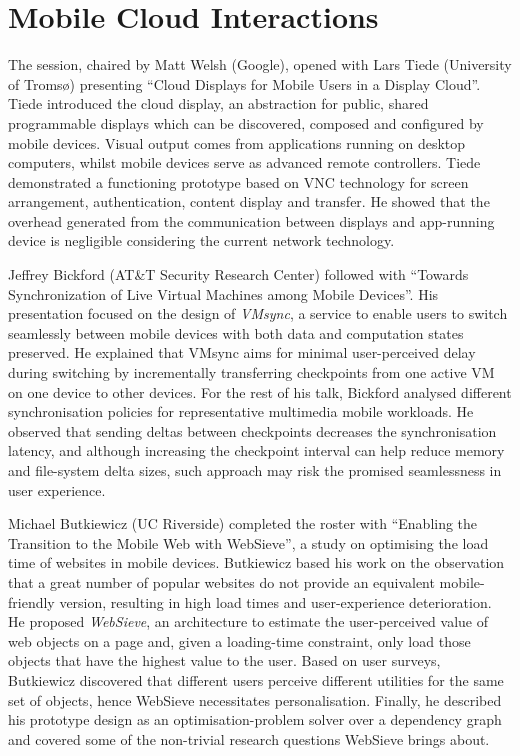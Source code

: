 \section{Mobile Cloud Interactions}
\label{sec:mobilecloud}

The session, chaired by Matt Welsh (Google), opened with Lars Tiede
(University of Tromsø) presenting ``Cloud Displays for Mobile Users in a
Display Cloud''. Tiede introduced the cloud display, an abstraction for
public, shared programmable displays which can be discovered, composed
and configured by mobile devices. Visual output comes from
applications running on desktop computers, whilst mobile devices serve as
advanced remote controllers. Tiede demonstrated a functioning
prototype based on VNC technology for screen arrangement,
authentication, content display and transfer. He showed that the
overhead generated from the communication between displays and
app-running device is negligible considering the current network
technology.

Jeffrey Bickford (AT\&T Security Research Center) followed with
``Towards Synchronization of Live Virtual Machines among Mobile
Devices''. His presentation focused on the design of \emph{VMsync}, a
service to enable users to switch seamlessly between mobile devices
with both data and computation states preserved. He explained that VMsync
aims for minimal user-perceived delay during switching by incrementally
transferring checkpoints from one active VM on one device to other
devices. For the rest of his talk, Bickford analysed different
synchronisation policies for representative multimedia mobile workloads.
He observed that sending deltas between checkpoints decreases the
synchronisation latency, and although increasing the checkpoint interval
can help reduce memory and file-system delta sizes, such approach may
risk the promised seamlessness in user experience.

Michael Butkiewicz (UC Riverside) completed the roster with ``Enabling
the Transition to the Mobile Web with WebSieve'', a study on optimising
the load time of websites in mobile devices. Butkiewicz based his work
on the observation that a great number of popular websites do
not provide an equivalent mobile-friendly version, resulting in high
load times and user-experience deterioration. He proposed
\emph{WebSieve}, an architecture to estimate the user-perceived value of
web objects on a page and, given a loading-time constraint, only load 
those objects that have the highest value to the user. Based on user
surveys, Butkiewicz discovered that different users perceive different
utilities for the same set of objects, hence WebSieve necessitates
personalisation.  Finally, he described his prototype design as an
optimisation-problem solver over a dependency graph and covered
some of the non-trivial research questions WebSieve brings about.

